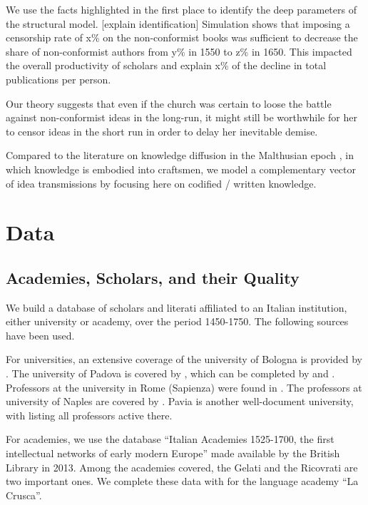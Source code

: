 \documentclass[12pt]{article}
\begin{document}
We use the facts highlighted in the first place to identify the deep parameters of the structural model. [explain identification] Simulation shows that imposing a censorship rate of x\% on the non-conformist books was sufficient to decrease the share of non-conformist authors from y\% in 1550 to z\% in 1650. This impacted the overall productivity of scholars and explain x\% of the decline in total publications per person.

Our theory suggests that even if the church was certain to loose the battle against non-conformist ideas in the long-run, it might still be worthwhile for her to censor ideas in the short run in order to delay her inevitable demise.

Compared to the literature on knowledge diffusion in the Malthusian epoch \cite{de2017clans}, in which knowledge is embodied into craftsmen, we model a complementary vector of idea transmissions by focusing here on codified / written knowledge.

\section{Data}

\subsection{Academies, Scholars, and their Quality}\label{section:data}

We build a database of scholars and literati affiliated to an Italian institution, either university or academy, over the period 1450-1750. The following sources have been used.

For universities, an  extensive coverage of the university of Bologna is provided by . The university of Padova is covered by , which can be completed by   and . Professors at the university in Rome (Sapienza) were found in . The professors at university of Naples are covered by . Pavia is another well-document university, with  listing all professors active there.


For academies, we use the database ``Italian Academies 1525-1700, the first intellectual networks of early modern Europe'' made available by the British Library in 2013. Among the academies covered, the Gelati and the Ricovrati are two important ones. We complete these data with   for the language academy ``La Crusca''.
\end{document}
